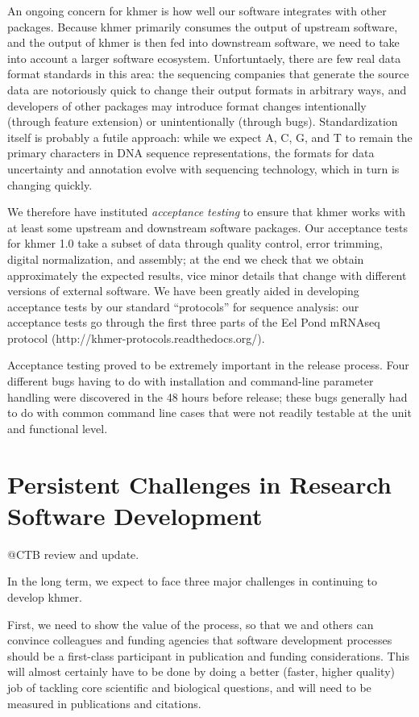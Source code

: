 \documentclass[11pt]{article}
\begin{document}
An ongoing concern for khmer is how well our software integrates with
other packages.  Because khmer primarily consumes the output of
upstream software, and the output of khmer is then fed into downstream
software, we need to take into account a larger software ecosystem.
Unfortuntaely, there are few real data format standards in this area:
the sequencing companies that generate the source data are notoriously
quick to change their output formats in arbitrary ways, and developers
of other packages may introduce format changes intentionally (through
feature extension) or unintentionally (through bugs).  Standardization
itself is probably a futile approach: while we expect A, C, G, and
T to remain the primary characters in DNA sequence representations,
the formats for data uncertainty and annotation evolve with
sequencing technology, which in turn is changing quickly.

We therefore have instituted {\em acceptance testing} to ensure that
khmer works with at least some upstream and downstream software
packages.  Our acceptance tests for khmer 1.0 take a subset of data
through quality control, error trimming, digital normalization, and
assembly; at the end we check that we obtain approximately the
expected results, vice minor details that change with different
versions of external software.  We have been greatly aided in
developing acceptance tests by our standard ``protocols'' for sequence
analysis: our acceptance tests go through the first three parts of the
Eel Pond mRNAseq protocol (http://khmer-protocols.readthedocs.org/).

Acceptance testing proved to be extremely important in the release
process.  Four different bugs having to do with installation and
command-line parameter handling were discovered in the 48 hours before
release; these bugs generally had to do with common command line cases
that were not readily testable at the unit and functional level.

\section{Persistent Challenges in Research Software Development}

@CTB review and update.

In the long term, we expect to face three major challenges in continuing
to develop khmer.

First, we need to show the value of the process, so that we and others
can convince colleagues and funding agencies that software development
processes should be a first-class participant in publication and
funding considerations.  This will almost certainly have to be done
by doing a better (faster, higher quality) job of tackling core
scientific and biological questions, and will need to be measured
in publications and citations.
\end{document}
